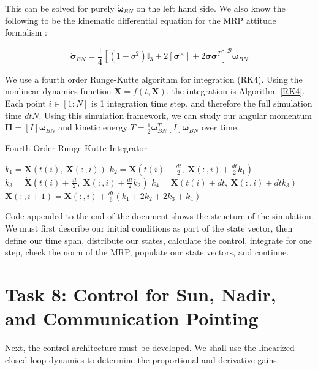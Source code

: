 \documentclass[paper]{aiaaNew}
\begin{document}
This can be solved for purely $\bm{\dot{\omega}}_{BN}$ on the left hand side. We also know the following to be the kinematic differential equation for the MRP attitude formalism \cite{sj}:

\begin{equation}
  \bm{\dot{\sigma}}_{BN} = \frac{1}{4} [(1-\sigma^2)\mathbb{I}_3 + 2[\bm{\sigma}^\times] + 2\bm{\sigma}\bm{\sigma}^T]^\mathcal{B}\bm{{\omega}}_{BN}
\end{equation}


We use a fourth order Runge-Kutte algorithm for integration (RK4). Using the nonlinear dynamics function $\dot{\bm{X}} = f(t,\bm{X})$, the integration is Algorithm \ref{RK4}. Each point $i \in [1:N]$ is 1 integration time step, and therefore the full simulation time $dtN$. Using this simulation framework, we can study our angular momentum $\bm{H} = [I]\bm{\omega}_{BN}$ and kinetic energy $T = \frac{1}{2} \bm{\omega}_{BN}^T [I] \bm{\omega}_{BN}$ over time.

\begin{algorithm}
\caption{Fourth Order Runge Kutte Integrator}\label{RK4}
\begin{algorithmic}[1]
    \State $ k_1 = \dot{\bm{X}}(t(i), \ \bm{X}(:,i))$
    \State $ k_2 = \dot{\bm{X}}(t(i)+ \frac{dt}{2}, \  \bm{X}(:,i)+ \frac{dt}{2} k_1)$
    \State $ k_3 = \dot{\bm{X}}(t(i)+ \frac{dt}{2}, \ \bm{X}(:,i)+ \frac{dt}{2} k_2)$
    \State $ k_4 = \dot{\bm{X}}(t(i)+dt,  \ \bm{X}(:,i) + dt k_3)$
    \State $ \bm{X}(:,i+1) =  \bm{X}(:,i) + \frac{dt}{6}(k_1+2k_2+2k_3+k_4)$
\EndFor
\end{algorithmic}
\end{algorithm}

Code appended to the end of the document shows the structure of the simulation. We must first describe our initial conditions as part of the state vector, then define our time span, distribute our states, calculate the control, integrate for one step, check the norm of the MRP, populate our state vectors, and continue.








\section*{Task 8: Control for Sun, Nadir, and Communication Pointing}
Next, the control architecture must be developed. We shall use the linearized closed loop dynamics to determine the proportional and derivative gains.
\end{document}
